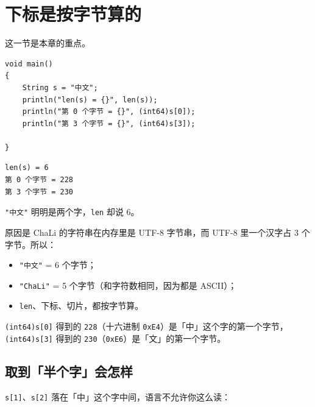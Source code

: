\section{下标是按字节算的}

这一节是本章的重点。

\par
\medskip
\begin{lstlisting}[style=chali]
void main()
{
    String s = "中文";
    println("len(s) = {}", len(s));
    println("第 0 个字节 = {}", (int64)s[0]);
    println("第 3 个字节 = {}", (int64)s[3]);

}
\end{lstlisting}
\par
\medskip

\par
\medskip
\begin{lstlisting}[style=out]
len(s) = 6
第 0 个字节 = 228
第 3 个字节 = 230
\end{lstlisting}
\par
\medskip

\texttt{"中文"} 明明是两个字，\texttt{len} 却说 6。

原因是 ChaLi 的字符串在内存里是 UTF-8 字节串，而 UTF-8 里一个汉字占 3 个字节。所以：

\begin{itemize}

\item \texttt{"中文"} = 6 个字节；

\item \texttt{"Cha\allowbreak{}Li"} = 5 个字节（和字符数相同，因为都是 ASCII）；

\item \texttt{len}、下标、切片，都按字节算。

\end{itemize}

\texttt{(\allowbreak{}int64)\allowbreak{}s[\allowbreak{}0]\allowbreak{}} 得到的 \texttt{228}（十六进制 \texttt{0x\allowbreak{}E4}）是「中」这个字的第一个字节，\texttt{(\allowbreak{}int64)\allowbreak{}s[\allowbreak{}3]\allowbreak{}} 得到的 \texttt{230}（\texttt{0x\allowbreak{}E6}）是「文」的第一个字节。

\subsection*{取到「半个字」会怎样}

\texttt{s[\allowbreak{}1]\allowbreak{}}、\texttt{s[\allowbreak{}2]\allowbreak{}} 落在「中」这个字中间，语言不允许你这么读：

